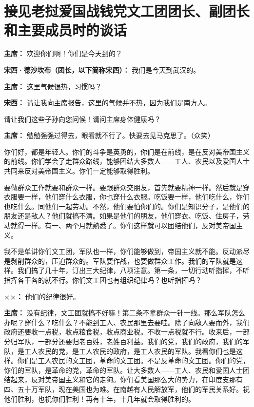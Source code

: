 \section[接见老挝爱国战钱党文工团团长、副团长和主要成员时的谈话（一九六四年九月四日武汉）]{接见老挝爱国战钱党文工团团长、副团长和主要成员时的谈话}

\begin{duihua}

\item[\textbf{主席：}] 欢迎你们啊！你们是今天到的？

\item[\textbf{宋西·德沙坎布（团长，以下简称宋西）：}] 我们是今天到武汉的。

\item[\textbf{主席：}] 这里气候很热，习惯吗？

\item[\textbf{宋西：}] 请让我向主席报告，这里的气候并不热，因为我们是南方人。

请让我们这些子孙向您问候！请问主席身体健康吗？ 

\item[\textbf{主席：}] 勉勉强强过得去，眼看就不行了。快要去见马克思了。（众笑）

你们好，都是年轻人。你们的斗争是英勇的，你们是在前线，是在反对美帝国主义的前线。你们学会了走群众路线，能够团结大多数人——工人、农民以及爱国人士共同来反对美帝国主义。你们一定能够取得胜利。

要做群众工作就要和群众一样。要跟群众交朋友，首先就要精神一样。然后就是穿衣服要一样，他们穿什么衣服，你也穿什么衣服。吃饭要一样，他们吃什么，你们也吃什么。同他们一起劳动。不然，他们要怕你们的。你们是知识分子，是他们的朋友还是敌人？他们就搞不清。如果是他们的朋友，他们穿衣、吃饭、住房子，劳动就得一样。有一、两个月就熟悉了。你们这样就可以团结他们，反对美帝国主义。

我不是单讲你们文工团，军队也一样，你们能够做到，帝国主义就不能。反动派尽是剥削群众的，压迫群众的。军队要作战，也要做群众工作。我们的军队就是这样。我们搞了几十年，订出三大纪律，八项注意。第一条，一切行动听指挥，不听指挥各干各的就不行。你们文工团也有组织纪律吗？也听指挥吗？

\item[\textbf{××：}] 他们的纪律很好。

\item[\textbf{主席：}] 没有纪律，文工团就搞不好嘛！第二条不拿群众一针一线。那么军队怎么办呢？穿什么？吃什么？不能到工人、农民那里去要哇。除了向敌人要而外，我们政府还要收一点税，收点粮食税，收点商业税。不收一点税就不行。收来后，一部分归军队，一部分还要归老百姓，老姓百利益。我们的党，我们的政府，我们的军队，是工人农民的党，是工人农民的政府，是工人农民的军队。我看你们也是这样。你们是工人农民的文工团，革命的文工团。不是反革命的文工团。你们的党，你们的军队，是革命的党，革命的军队。让大多数人——工人、农民和爱国人士团结起来，反对美帝国主义和它的走狗。你们看美国那么大的势力，在印度支那有四、五十万军队，现在美国也为难。在南越有人民解放军，他们的军民关系好。祝他们胜利，也祝你们胜利！再有十年，十几年就会取得胜利的。


\end{duihua}
